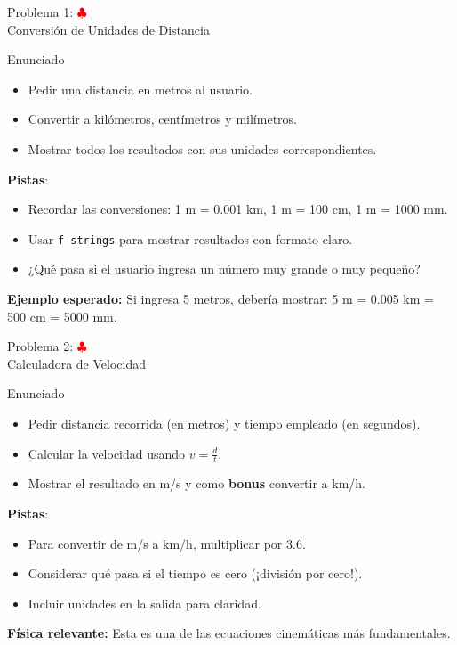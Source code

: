 \documentclass[10pt]{beamer}
\begin{document}
\begin{frame}{Problema 1: \hfill \textcolor{red}{$\clubsuit$} \\ Conversión de Unidades de Distancia}
\begin{block}{Enunciado}
  \begin{itemize}
    \item Pedir una distancia en metros al usuario.
    \item Convertir a kilómetros, centímetros y milímetros.
    \item Mostrar todos los resultados con sus unidades correspondientes.
  \end{itemize}
\end{block}
\textbf{Pistas}:
\begin{itemize}
  \item Recordar las conversiones: 1 m = 0.001 km, 1 m = 100 cm, 1 m = 1000 mm.
  \item Usar \texttt{f-strings} para mostrar resultados con formato claro.
  \item ¿Qué pasa si el usuario ingresa un número muy grande o muy pequeño?
\end{itemize}

\textbf{Ejemplo esperado:} Si ingresa 5 metros, debería mostrar: 5 m = 0.005 km = 500 cm = 5000 mm.

\end{frame}

\begin{frame}{Problema 2: \hfill \textcolor{red}{$\clubsuit$} \\ Calculadora de Velocidad}
\begin{block}{Enunciado}
  \begin{itemize}
    \item Pedir distancia recorrida (en metros) y tiempo empleado (en segundos).
    \item Calcular la velocidad usando \(v = \frac{d}{t}\).
    \item Mostrar el resultado en m/s y como \textbf{bonus} convertir a km/h.
  \end{itemize}
\end{block}
\textbf{Pistas}:
\begin{itemize}
  \item Para convertir de m/s a km/h, multiplicar por 3.6.
  \item Considerar qué pasa si el tiempo es cero (¡división por cero!).
  \item Incluir unidades en la salida para claridad.
\end{itemize}

\textbf{Física relevante:} Esta es una de las ecuaciones cinemáticas más fundamentales.

\end{frame}
\end{document}
